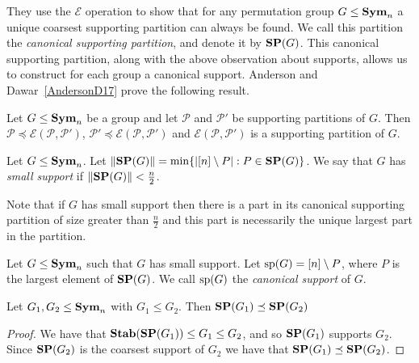 \documentclass[../paper.tex]{subfiles}
\begin{document}
They use the $\mathcal{E}$ operation to show that for any permutation group $G
\leq \text{\textbf{Sym}}_n$ a unique coarsest supporting partition can always be found. We call
this partition the \emph{canonical supporting partition}, and denote it by $\text{\textbf{SP}}
(G)$. This canonical supporting partition, along with the above observation
about supports, allows us to construct for each group a canonical support.
Anderson and Dawar~\ref{AndersonD17} prove the following result.

\begin{prop}
  \label{prop:combining-supporting-patitions}
  Let $G \leq \text{\textbf{Sym}}_n$ be a group and let $\mathcal{P}$ and $\mathcal{P}'$ be
  supporting partitions of $G$. Then $\mathcal{P} \preceq
  \mathcal{E}(\mathcal{P}, \mathcal{P}')$, $ \mathcal{P}' \preceq
  \mathcal{E}(\mathcal{P}, \mathcal{P}')$ and $\mathcal{E}(\mathcal{P},
  \mathcal{P}')$ is a supporting partition of $G$.
\end{prop}

\begin{definition}
  Let $G \leq \text{\textbf{Sym}}_n$. Let $\| \text{\textbf{SP}}(G) \| = \min \{\vert [n] \setminus P \vert :
  P \in \text{\textbf{SP}}(G) \}$. We say that $G$ has \emph{small support} if $\| \text{\textbf{SP}}(G) \| <
  \frac{n}{2}$.
\end{definition}

Note that if $G$ has small support then there is a part in its canonical
supporting partition of size greater than $\frac{n}{2}$ and this part is
necessarily the unique largest part in the partition.

\begin{definition}
  Let $G \leq \text{\textbf{Sym}}_n$ such that $G$ has small support. Let $\text{sp}(G) = [n]
  \setminus P$, where $P$ is the largest element of $\text{\textbf{SP}}(G)$. We call
  $\text{sp}(G)$ the \emph{canonical support} of $G$.
\end{definition}


\begin{lem}\label{lem:subgroup-coarse}
  Let $G_1, G_2 \leq \text{\textbf{Sym}}_n$ with $G_1 \leq G_2$. Then $\text{\textbf{SP}}(G_1) \preceq
  \text{\textbf{SP}}(G_2)$
\end{lem}
\begin{proof}
  We have that $\text{\textbf{Stab}}(\text{\textbf{SP}}(G_1)) \leq G_1 \leq G_2$, and so $\text{\textbf{SP}}(G_1)$ supports
  $G_2$. Since $\text{\textbf{SP}}(G_2)$ is the coarsest support of $G_2$ we have that $\text{\textbf{SP}}(G_1) \preceq
  \text{\textbf{SP}}(G_2)$.
\end{proof}
\end{document}
